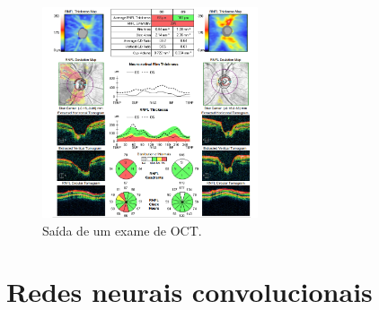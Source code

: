 \documentclass[conference]{IEEEtran}
\begin{document}

\begin{figure}[!tp]
  \centering
  \includegraphics[width=2.5in]{img/oct.png}
  \caption{Saída de um exame de OCT.}
  \label{fig:oct}
\end{figure}

\section{Redes neurais convolucionais}
\end{document}
